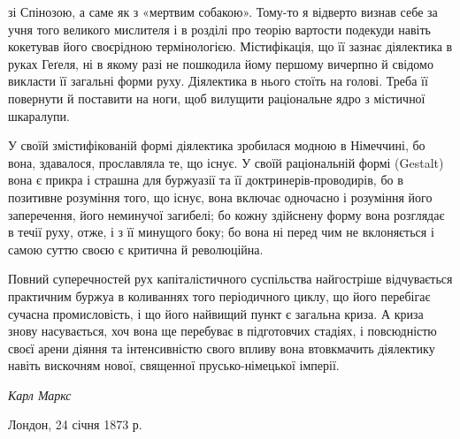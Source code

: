 \parcont{}  %
зі Спінозою, а саме як з «мертвим собакою». Тому-то я відверто
визнав себе за учня того великого мислителя і в розділі про теорію
вартости подекуди навіть кокетував його своєрідною термінологією.
Містифікація, що її зазнає діялектика в руках Геґеля, ні в
якому разі не пошкодила йому першому вичерпно й свідомо викласти
її загальні форми руху. Діялектика в нього стоїть на голові.
Треба її повернути й поставити на ноги, щоб вилущити раціональне
ядро з містичної шкаралупи.

У своїй змістифікованій формі діялектика зробилася модною
в Німеччині, бо вона, здавалося, прославляла те, що існує.
У своїй раціональній формі (Gestalt) вона є прикра і страшна для
буржуазії та її доктринерів-проводирів, бо в позитивне розуміння
того, що існує, вона включає одночасно і розуміння його
заперечення, його неминучої загибелі; бо кожну здійснену форму
вона розглядає в течії руху, отже, і з її минущого боку; бо вона
ні перед чим не вклоняється і самою суттю своєю є критична
й революційна.

Повний суперечностей рух капіталістичного суспільства найгостріше
відчувається практичним буржуа в коливаннях того періодичного
циклу, що його перебігає сучасна промисловість, і що
його найвищий пункт є загальна криза. А криза знову насувається,
хоч вона ще перебуває в підготовчих стадіях, і повсюдністю
своєї арени діяння та інтенсивністю свого впливу вона
втовкмачить діялектику навіть вискочням нової, священної прусько-німецької
імперії.

\begin{flushright}
\emph{Карл Маркс}
\end{flushright}

Лондон, 24 січня 1873 р.
